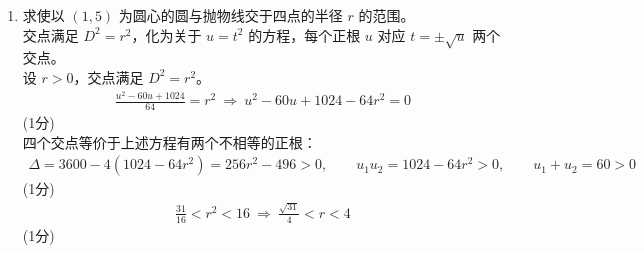 \begin{solution}
\begin{enumerate}[label=(\alph*)]
        \item 求使以 $(1,5)$ 为圆心的圆与抛物线交于四点的半径 $r$ 的范围。\\
        交点满足 $D^2=r^2$，化为关于 $u=t^2$ 的方程，每个正根 $u$ 对应 $t=\pm\sqrt u$ 两个交点。\\
        设 $r>0$，交点满足 $D^2=r^2$。\\
        \begin{align*}
            \frac{u^2-60u+1024}{64}=r^2\ \Rightarrow\ u^2-60u+1024-64r^2=0
        \end{align*}
        \hfill (1分) \\
        四个交点等价于上述方程有两个不相等的正根：
        \begin{align*}
            \Delta=3600-4(1024-64r^2)=256r^2-496>0,\qquad
            u_1u_2=1024-64r^2>0,\qquad u_1+u_2=60>0
        \end{align*}
        \hfill (1分) \\
        \begin{align*}
            \frac{31}{16}<r^2<16\ \Rightarrow\ \frac{\sqrt{31}}{4}<r<4
        \end{align*}
        \hfill (1分)
    \end{enumerate}
\end{solution}
